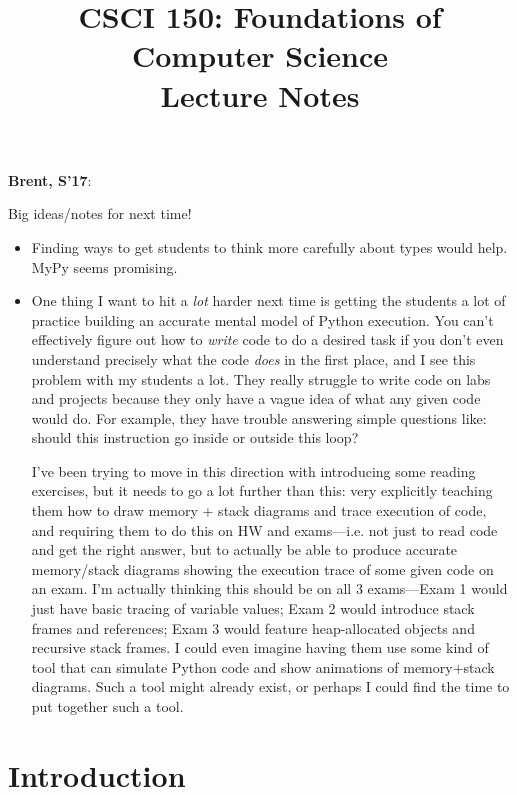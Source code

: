 \documentclass{article}
\newenvironment{reflect}[1]
{
  \noindent
  \begin{lrbox}{\reflectbox}
    \begin{minipage}[t]{\textwidth}
      \textbf{#1}:
}{
    \end{minipage}
  \end{lrbox}
  \fbox{\usebox{\reflectbox}}
}
\begin{document}
\title{CSCI 150: Foundations of Computer Science \\ Lecture Notes}

\maketitle

\begin{reflect}{Brent, S'17}

  Big ideas/notes for next time!
  \begin{itemize}
  \item Finding ways to get students to think more carefully about
    types would help.  MyPy seems promising.
  \item One thing I want to hit a \emph{lot} harder next time is
    getting the students a lot of practice building an accurate mental
    model of Python execution.  You can't effectively figure out how
    to \emph{write} code to do a desired task if you don't even
    understand precisely what the code \emph{does} in the first place,
    and I see this problem with my students a lot.  They really
    struggle to write code on labs and projects because they only have
    a vague idea of what any given code would do.  For example, they
    have trouble answering simple questions like: should this
    instruction go inside or outside this loop?

    I've been trying to move in this direction with introducing some
    reading exercises, but it needs to go a lot further than this:
    very explicitly teaching them how to draw memory + stack diagrams
    and trace execution of code, and requiring them to do this on HW
    and exams---i.e. not just to read code and get the right answer,
    but to actually be able to produce accurate memory/stack diagrams
    showing the execution trace of some given code on an exam.  I'm
    actually thinking this should be on all 3 exams---Exam 1 would
    just have basic tracing of variable values; Exam 2 would introduce
    stack frames and references; Exam 3 would feature heap-allocated
    objects and recursive stack frames.  I could even imagine having
    them use some kind of tool that can simulate Python code and show
    animations of memory+stack diagrams.  Such a tool might already
    exist, or perhaps I could find the time to put together such a
    tool.
  \end{itemize}
\end{reflect}

\section{Introduction}
\end{document}
